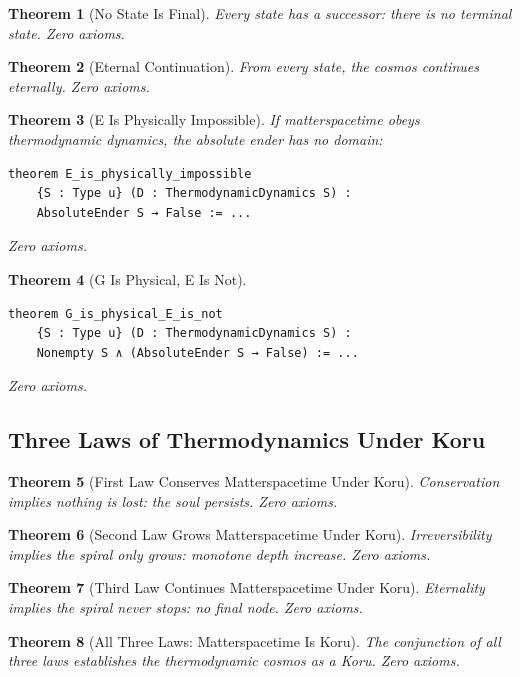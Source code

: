 \documentclass[11pt,a4paper]{article}
\newtheorem{theorem}{Theorem}[section]
\theoremstyle{definition}
\theoremstyle{remark}
\begin{document}
\begin{theorem}[No State Is Final]
Every state has a successor: there is no terminal state. Zero axioms.
\end{theorem}

\begin{theorem}[Eternal Continuation]
From every state, the cosmos continues eternally. Zero axioms.
\end{theorem}

\begin{theorem}[E Is Physically Impossible]
If matterspacetime obeys thermodynamic dynamics, the absolute ender has no domain:
\begin{lstlisting}
theorem E_is_physically_impossible
    {S : Type u} (D : ThermodynamicDynamics S) :
    AbsoluteEnder S → False := ...
\end{lstlisting}
Zero axioms.
\end{theorem}

\begin{theorem}[G Is Physical, E Is Not]
\begin{lstlisting}
theorem G_is_physical_E_is_not
    {S : Type u} (D : ThermodynamicDynamics S) :
    Nonempty S ∧ (AbsoluteEnder S → False) := ...
\end{lstlisting}
Zero axioms.
\end{theorem}

\subsection{Three Laws of Thermodynamics Under Koru}

\begin{theorem}[First Law Conserves Matterspacetime Under Koru]
Conservation implies nothing is lost: the soul persists. Zero axioms.
\end{theorem}

\begin{theorem}[Second Law Grows Matterspacetime Under Koru]
Irreversibility implies the spiral only grows: monotone depth increase. Zero axioms.
\end{theorem}

\begin{theorem}[Third Law Continues Matterspacetime Under Koru]
Eternality implies the spiral never stops: no final node. Zero axioms.
\end{theorem}

\begin{theorem}[All Three Laws: Matterspacetime Is Koru]
The conjunction of all three laws establishes the thermodynamic cosmos as a Koru. Zero axioms.
\end{theorem}
\end{document}
